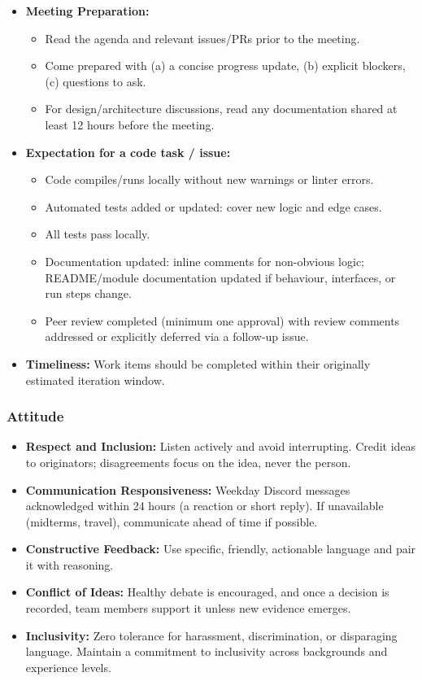 \documentclass{article}
\begin{document}
\begin{itemize}
  \item \textbf{Meeting Preparation:}
  \begin{itemize}
    \item Read the agenda and relevant issues/PRs prior to the meeting.
    \item Come prepared with (a) a concise progress update, (b) explicit blockers, (c) questions to ask.
  \item For design/architecture discussions, read any documentation shared at least 12 hours before the meeting.
  \end{itemize}
  \item \textbf{Expectation for a code task / issue:}
  \begin{itemize}
  \item Code compiles/runs locally without new warnings or linter errors.
  \item Automated tests added or updated: cover new logic and edge cases.
    \item All tests pass locally.
  \item Documentation updated: inline comments for non-obvious logic; README/module documentation updated if behaviour, interfaces, or run steps change.
    \item Peer review completed (minimum one approval) with review comments addressed or explicitly deferred via a follow-up issue.
  \end{itemize}
  \item \textbf{Timeliness:} Work items should be completed within their originally estimated iteration window.
\end{itemize}

\subsubsection*{Attitude}

\begin{itemize}
  \item \textbf{Respect and Inclusion:} Listen actively and avoid interrupting. Credit ideas to originators; disagreements focus on the idea, never the person.
  \item \textbf{Communication Responsiveness:} Weekday Discord messages acknowledged within 24 hours (a reaction or short reply). If unavailable (midterms, travel), communicate ahead of time if possible.
  \item \textbf{Constructive Feedback:} Use specific, friendly, actionable language and pair it with reasoning.
  \item \textbf{Conflict of Ideas:} Healthy debate is encouraged, and once a decision is recorded, team members support it unless new evidence emerges.
  \item \textbf{Inclusivity:} Zero tolerance for harassment, discrimination, or disparaging language. Maintain a commitment to inclusivity across backgrounds and experience levels.
\end{itemize}
\end{document}
